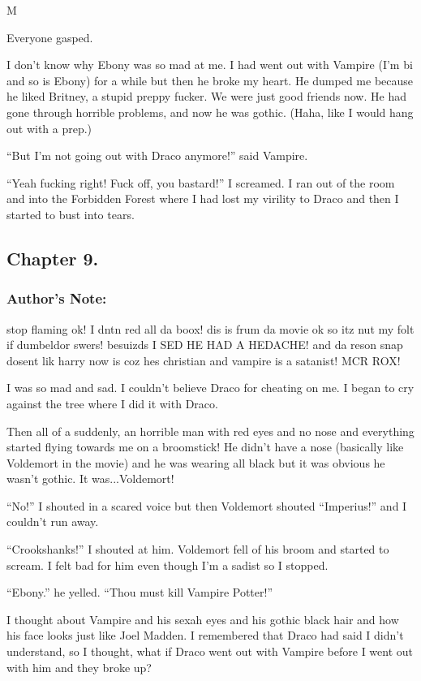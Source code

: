 M\documentclass{article}
\begin{document}
Everyone gasped.

I don’t know why Ebony was so mad at me. I had went out with Vampire (I’m bi and so is Ebony) for a while but then he broke my heart. He dumped me because he liked Britney, a stupid preppy fucker. We were just good friends now. He had gone through horrible problems, and now he was gothic. (Haha, like I would hang out with a prep.)

“But I’m not going out with Draco anymore!” said Vampire.

“Yeah fucking right! Fuck off, you bastard!” I screamed. I ran out of the room and into the Forbidden Forest where I had lost my virility to Draco and then I started to bust into tears.

\clearpage\nolinenumbers
\subsection*{Chapter 9.}

\subsubsection*{Author's Note: }stop flaming ok! I dntn red all da boox! dis is frum da movie ok so itz nut my folt if dumbeldor swers! besuizds I SED HE HAD A HEDACHE! and da reson snap dosent lik harry now is coz hes christian and vampire is a satanist! MCR ROX!

\textbreak
\linenumbers\resetlinenumber

I was so mad and sad. I couldn’t believe Draco for cheating on me. I began to cry against the tree where I did it with Draco.

Then all of a suddenly, an horrible man with red eyes and no nose and everything started flying towards me on a broomstick! He didn’t have a nose (basically like Voldemort in the movie) and he was wearing all black but it was obvious he wasn’t gothic. It was...Voldemort!

“No!” I shouted in a scared voice but then Voldemort shouted “Imperius!” and I couldn’t run away.

“Crookshanks!” I shouted at him. Voldemort fell of his broom and started to scream. I felt bad for him even though I’m a sadist so I stopped.

“Ebony.” he yelled. “Thou must kill Vampire Potter!”

I thought about Vampire and his sexah eyes and his gothic black hair and how his face looks just like Joel Madden. I remembered that Draco had said I didn’t understand, so I thought, what if Draco went out with Vampire before I went out with him and they broke up?
\end{document}
